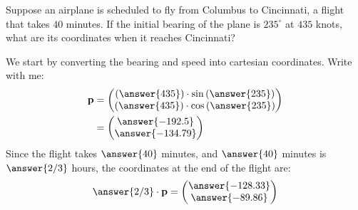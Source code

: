 \documentclass{ximera}
\author{Parisa Fatheddin \and Bart Snapp}
\begin{document}
\begin{exercise}


Suppose an airplane is scheduled to fly from Columbus to Cincinnati, a
flight that takes $40$ minutes.  If the initial bearing of the plane
is $235^{\circ}$ at $435$ knots, what are its coordinates when it
reaches Cincinnati?
\begin{prompt}
We start by converting the bearing and speed into cartesian coordinates. Write with me:
  \begin{align*}
    \vec{p} &=
    \begin{pmatrix}
      \left(\answer{435}\right)\cdot\sin\left(\answer{235}\right)\\
      \left(\answer{435}\right)\cdot\cos\left(\answer{235}\right)
    \end{pmatrix}\\
    &=\begin{pmatrix}
      \answer{-192.5} \\
    \answer{-134.79}
  \end{pmatrix}
  \end{align*}
  Since the flight takes $\answer{40}$ minutes, and $\answer{40}$
  minutes is $\answer{2/3}$ hours, the coordinates at the end of the flight are:
  \[
\answer{2/3} \cdot \vec{p} = \begin{pmatrix}
      \answer{-128.33} \\
    \answer{-89.86}
  \end{pmatrix}
  \]
\end{prompt}
\end{exercise}
\end{document}
